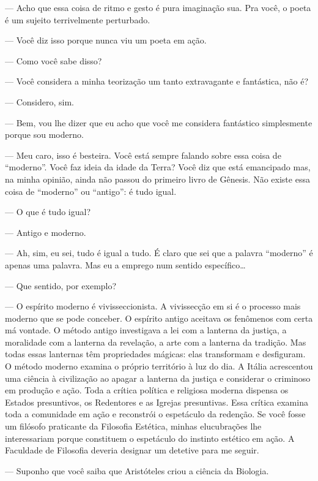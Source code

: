 --- Acho que essa coisa de ritmo e gesto é pura imaginação sua.  Pra você, o
poeta é um sujeito terrivelmente perturbado.

--- Você diz isso porque nunca viu um poeta em ação.

--- Como você sabe disso?

--- Você considera a minha teorização um tanto extravagante e fantástica, não
é?

--- Considero, sim.

--- Bem, vou lhe dizer que eu acho que você me considera fantástico
simplesmente porque sou moderno.

--- Meu caro, isso é besteira.  Você está sempre falando sobre essa coisa de
“moderno”.  Você faz ideia da idade da Terra?  Você \label{diz"-que} diz que está emancipado
mas, na minha opinião, ainda não passou do primeiro livro de Gênesis.  Não
existe essa coisa de “moderno” ou “antigo”: é tudo igual.

--- O que é tudo igual?

--- Antigo e moderno.

--- Ah, sim, eu sei, tudo é igual a tudo.  É claro que sei que a palavra
“moderno” é apenas uma palavra.  Mas eu a emprego num sentido específico\ldots{}

--- Que sentido, por exemplo?

--- O espírito moderno é vivisseccionista.  A vivissecção em si é o processo
mais moderno que se pode conceber.  O espírito antigo aceitava os fenômenos com
certa má vontade.  O método antigo investigava a lei com a lanterna da justiça,
a moralidade com a lanterna da revelação, a arte com a lanterna da tradição.
Mas todas essas lanternas têm propriedades mágicas: elas transformam e
desfiguram.  O método moderno examina o próprio território à luz do dia.  A
Itália acrescentou uma ciência à civilização ao apagar a lanterna da justiça e
considerar o criminoso em produção e ação.  Toda a crítica política e
religiosa moderna dispensa os Estados presuntivos, os Redentores e as
Igrejas presuntivas. Essa crítica examina toda a comunidade em ação e
reconstrói o espetáculo da redenção.  Se você fosse um filósofo praticante da
Filosofia Estética, minhas elucubrações lhe interessariam porque constituem o
espetáculo do instinto estético em ação.  A Faculdade de Filosofia deveria
designar um detetive para me seguir.

--- Suponho que você saiba que Aristóteles criou a ciência da Biologia.


